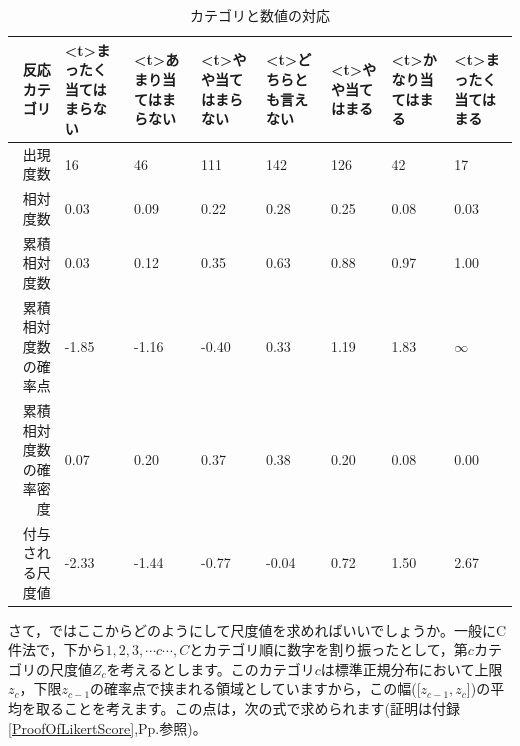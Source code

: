 \documentclass{ltjsbook}
\begin{document}
\begin{table}[ht]
	\centering
	\caption{カテゴリと数値の対応}
	\begin{tabular}{rp{1cm}p{1cm}p{1cm}p{1cm}p{1cm}p{1cm}p{1cm}}
		\hline
		反応カテゴリ      & \pbox<t>{\small{まったく当てはまらない}} & \pbox<t>{\small{あまり当てはまらない}} & \pbox<t>{\small{やや当てはまらない}} & \pbox<t>{\small{どちらとも言えない}} & \pbox<t>{\small{やや当てはまる}} & \pbox<t>{\small{かなり当てはまる}} & \pbox<t>{\small{まったく当てはまる}} \\
		\hline
		出現度数        & 16                            & 46                           & 111                         & 142                         & 126                       & 42                         & 17                          \\
		相対度数        & 0.03                          & 0.09                         & 0.22                        & 0.28                        & 0.25                      & 0.08                       & 0.03                        \\
		累積相対度数      & 0.03                          & 0.12                         & 0.35                        & 0.63                        & 0.88                      & 0.97                       & 1.00                        \\
		累積相対度数の確率点  & -1.85                         & -1.16                        & -0.40                       & 0.33                        & 1.19                      & 1.83                       & $\infty$                    \\
		累積相対度数の確率密度 & 0.07                          & 0.20                         & 0.37                        & 0.38                        & 0.20                      & 0.08                       & 0.00                        \\
		付与される尺度値    & -2.33                         & -1.44                        & -0.77                       & -0.04                       & 0.72                      & 1.50                       & 2.67                        \\
		\hline
	\end{tabular}
	\label{tbl:02_01}
\end{table}

さて，ではここからどのようにして尺度値を求めればいいでしょうか。一般にC件法で，下から$1,2,3,\cdots c\cdots, C$とカテゴリ順に数字を割り振ったとして，第$c$カテゴリの尺度値$Z_c$を考えるとします。このカテゴリ$c$は標準正規分布において上限$z_c$，下限$z_{c-1}$の確率点で挟まれる領域としていますから，この幅([$z_{c-1} , z_c$])の平均を取ることを考えます。この点は，次の式で求められます(証明は付録\ref{ProofOfLikertScore},Pp.\pageref{ProofOfLikertScore}参照)。
\end{document}
